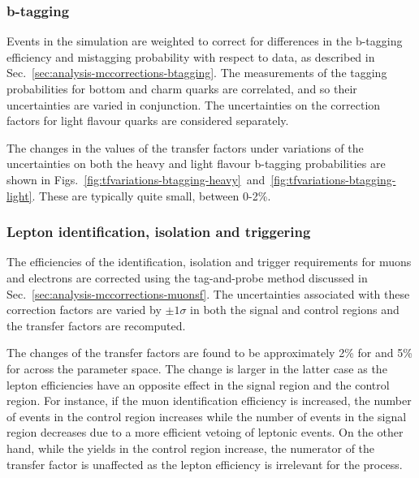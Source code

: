 \subsubsection{b-tagging}
Events in the simulation are weighted to correct for differences in the 
b-tagging efficiency and mistagging probability with respect to data, as 
described in Sec.~\ref{sec:analysis-mccorrections-btagging}. The measurements 
of the tagging probabilities for bottom and charm quarks are correlated, 
and so their uncertainties are varied in conjunction. 
The uncertainties on the correction factors for light flavour quarks are 
considered separately.

The changes in the values of the transfer factors under variations of the 
uncertainties on both the heavy and light flavour b-tagging probabilities are 
shown in 
Figs.~\ref{fig:tfvariations-btagging-heavy}~and~\ref{fig:tfvariations-btagging-light}.
 These are typically quite small, between 0-2\%.  

\subsubsection{Lepton identification, isolation and triggering}
The efficiencies of the identification, isolation and trigger requirements for 
muons and electrons are corrected using the tag-and-probe method discussed in 
Sec.~\ref{sec:analysis-mccorrections-muonsf}. The uncertainties associated with 
these correction factors are varied by $\pm1\sigma$ in both the signal and 
control regions and the transfer factors are recomputed. 

The changes of the transfer factors are found to be approximately 2\% for 
\Tmumutoz and 5\% for \Tmutottw across the \njnbht parameter space. The change 
is larger in the latter case as the lepton efficiencies have an opposite effect 
in the signal region and the \mj control region. For instance, if the muon 
identification 
efficiency is increased, the number of events in the \mj control region 
increases while the number of \ttw events in the signal region decreases due to 
a more efficient vetoing of leptonic events. On the other hand, while the 
yields in the \mmj control region increase, the numerator of the \Tmumutoz 
transfer factor is unaffected as the lepton efficiency is irrelevant for the 
\znnj process.


